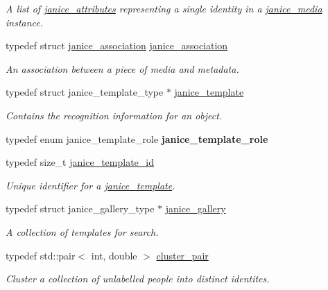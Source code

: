 \begin{DoxyCompactItemize}
\begin{DoxyCompactList}\small\item\em A list of \hyperlink{structjanice__attributes}{janice\+\_\+attributes} representing a single identity in a \hyperlink{structjanice__media}{janice\+\_\+media} instance. \end{DoxyCompactList}\item 
typedef struct \hyperlink{structjanice__association}{janice\+\_\+association} \hyperlink{group__janice_ga032bb29ff79b20db76d528b6672280d9}{janice\+\_\+association}
\begin{DoxyCompactList}\small\item\em An association between a piece of media and metadata. \end{DoxyCompactList}\item 
\hypertarget{group__janice_ga5593b06e86b90504968c0fc191ee2f3c}{}typedef struct janice\+\_\+template\+\_\+type $\ast$ \hyperlink{group__janice_ga5593b06e86b90504968c0fc191ee2f3c}{janice\+\_\+template}\label{group__janice_ga5593b06e86b90504968c0fc191ee2f3c}

\begin{DoxyCompactList}\small\item\em Contains the recognition information for an object. \end{DoxyCompactList}\item 
\hypertarget{group__janice_ga250a9862c40d7f77865153010840e9d4}{}typedef enum janice\+\_\+template\+\_\+role {\bfseries janice\+\_\+template\+\_\+role}\label{group__janice_ga250a9862c40d7f77865153010840e9d4}

\item 
typedef size\+\_\+t \hyperlink{group__janice_ga5ec62465fbbc7a92faadfefd3d20e25b}{janice\+\_\+template\+\_\+id}
\begin{DoxyCompactList}\small\item\em Unique identifier for a \hyperlink{group__janice_ga5593b06e86b90504968c0fc191ee2f3c}{janice\+\_\+template}. \end{DoxyCompactList}\item 
\hypertarget{group__janice_ga08feff1c2835b44332afeda80c3d0fb7}{}typedef struct janice\+\_\+gallery\+\_\+type $\ast$ \hyperlink{group__janice_ga08feff1c2835b44332afeda80c3d0fb7}{janice\+\_\+gallery}\label{group__janice_ga08feff1c2835b44332afeda80c3d0fb7}

\begin{DoxyCompactList}\small\item\em A collection of templates for search. \end{DoxyCompactList}\item 
typedef std\+::pair$<$ int, double $>$ \hyperlink{group__janice_ga469e8635dece2be63e8871ed3e2b2f4c}{cluster\+\_\+pair}
\begin{DoxyCompactList}\small\item\em Cluster a collection of unlabelled people into distinct identites. \end{DoxyCompactList}\end{DoxyCompactItemize}
